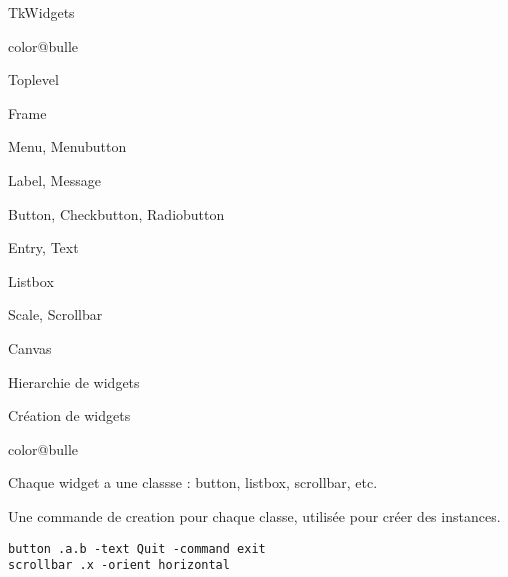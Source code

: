 \documentclass[a4paper,landscape,smooth]{show}
\begin{document}
\begin{part}{Tk}{Widgets}
   \vfill\small
   \begin{bitemize}{color@bulle}
      \item Toplevel
      \item Frame
      \item Menu, Menubutton
      \item Label, Message
      \item Button, Checkbutton, Radiobutton
      \item Entry, Text
      \item Listbox
      \item Scale, Scrollbar
      \item Canvas
   \end{bitemize}
   \vfill
\end{part}


\begin{tslide}{Hierarchie de widgets}
   \vfill\begin{center}
   \end{center}\vfill
\end{tslide}


\begin{tslide}{Création de widgets}
   \vfill
   \begin{bitemize}{color@bulle}
      \item Chaque widget a une classse : button, listbox, scrollbar,
	    etc. 
      \item Une commande de creation pour chaque classe, utilisée pour
	    créer des instances.
	    
	    {\tt button .a.b -text Quit -command exit}\\
	    {\tt scrollbar .x -orient horizontal}
   \end{bitemize}
   \vfill
\end{tslide}

\end{document}
